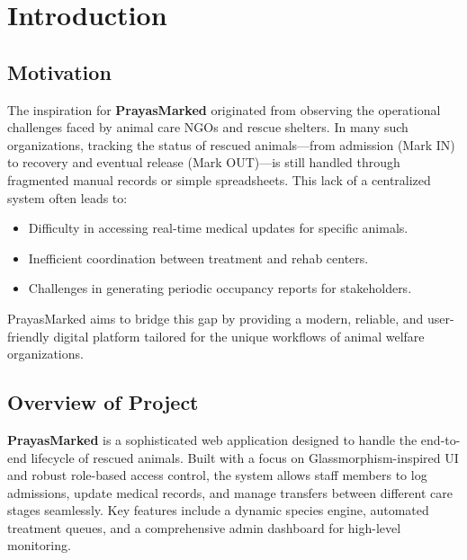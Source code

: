 \documentclass[12pt,a4paper]{report}
\begin{document}
\tableofcontents
\newpage
\listoffigures
\newpage
\listoftables
\newpage


\chapter{Introduction}
\section{Motivation}
The inspiration for \textbf{PrayasMarked} originated from observing the operational challenges faced by animal care NGOs and rescue shelters. In many such organizations, tracking the status of rescued animals—from admission (Mark IN) to recovery and eventual release (Mark OUT)—is still handled through fragmented manual records or simple spreadsheets. This lack of a centralized system often leads to:
\begin{itemize}
    \item Difficulty in accessing real-time medical updates for specific animals.
    \item Inefficient coordination between treatment and rehab centers.
    \item Challenges in generating periodic occupancy reports for stakeholders.
\end{itemize}
PrayasMarked aims to bridge this gap by providing a modern, reliable, and user-friendly digital platform tailored for the unique workflows of animal welfare organizations.

\section{Overview of Project}
\textbf{PrayasMarked} is a sophisticated web application designed to handle the end-to-end lifecycle of rescued animals. Built with a focus on Glassmorphism-inspired UI and robust role-based access control, the system allows staff members to log admissions, update medical records, and manage transfers between different care stages seamlessly. Key features include a dynamic species engine, automated treatment queues, and a comprehensive admin dashboard for high-level monitoring.
\end{document}
